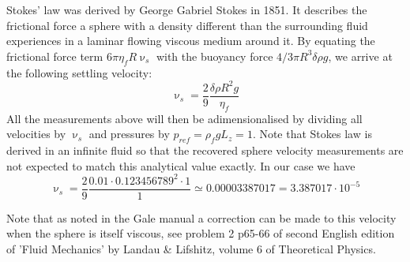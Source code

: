 Stokes' law was derived by George Gabriel Stokes in 1851.  It describes the frictional force a sphere with
a density different than the surrounding fluid experiences in a laminar flowing viscous medium around it. 
By equating the frictional force term $6\pi \eta_f R \upnu_s$ with the buoyancy force $4/3 \pi R^3 \delta\rho g$, 
we arrive at the following settling velocity:
\[
\upnu_s = \frac{2}{9} \frac{\delta\rho R^2 g}{\eta_f}
\]
All the measurements above will then be adimensionalised by dividing all velocities by $\upnu_s$ and pressures
by $p_{ref}=\rho_f g L_z = 1$. Note that Stokes law is derived in an infinite fluid so that the recovered sphere 
velocity measurements are not expected to match this analytical value exactly.
In our case we have 
\[
\upnu_s = \frac29 \frac{0.01\cdot 0.123456789^2\cdot 1}{1} \simeq 0.00003387017 = 3.387017 \cdot 10^{-5}
\]

Note that as noted in the Gale manual \cite{XXX} a correction can be made
to this velocity when the sphere is itself viscous, see problem 2 p65-66
of second English edition of 'Fluid Mechanics' by Landau \& Lifshitz, volume 6
of Theoretical Physics.  


